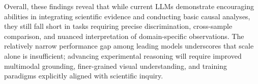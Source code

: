 Overall, these findings reveal that while current LLMs demonstrate encouraging abilities in integrating scientific evidence and conducting basic causal analyses, they still fall short in tasks requiring precise discrimination, cross-sample comparison, and nuanced interpretation of domain-specific observations. The relatively narrow performance gap among leading models underscores that scale alone is insufficient; advancing experimental reasoning will require improved multimodal grounding, finer-grained visual understanding, and training paradigms explicitly aligned with scientific inquiry.
